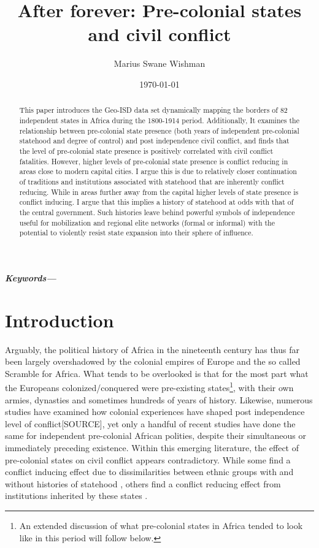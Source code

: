 \documentclass[12pt]{article}
\title{After forever: Pre-colonial states and civil conflict}
\author[1]{Marius Swane Wishman}
\affil[1]{Department of Sociology and Political Science, NTNU}
\date{\today}
\providecommand{\keywords}[1]
{
	\small	
	\textbf{\textit{Keywords---}} #1
}
\begin{document}
\maketitle

\begin{abstract}

This paper introduces the Geo-ISD data set dynamically mapping the borders of 82
independent states in Africa during the 1800-1914 period. Additionally, It
examines the relationship between pre-colonial state presence (both years of
independent pre-colonial statehood and degree of control) and post independence
civil conflict, and finds that the level of pre-colonial state presence is
positively correlated with civil conflict fatalities. However, higher levels of
pre-colonial state presence is conflict reducing in areas close to modern
capital cities. I argue this is due to relatively closer continuation of
traditions and institutions associated with statehood that are inherently
conflict reducing. While in areas further away from the capital higher levels of
state presence is conflict inducing. I argue that this implies a history of
statehood at odds with that of the central government. Such histories leave
behind powerful symbols of independence useful for mobilization and regional
elite networks (formal or informal) with the potential to violently resist state
expansion into their sphere of influence. 

\end{abstract}

\keywords{}


\onehalfspacing


\newpage

\section{Introduction}

Arguably, the political history of Africa in the nineteenth century has thus far
been largely overshadowed by the colonial empires of Europe and the so called
Scramble for Africa. What tends to be overlooked is that for the most part what
the Europeans colonized/conquered were pre-existing states\footnote{An extended
discussion of what pre-colonial states in Africa tended to look like in this
period will follow below.}, with their own armies, dynasties and sometimes
hundreds of years of history. Likewise, numerous studies have examined how
colonial experiences have shaped post independence level of conflict[SOURCE],
yet only a handful of recent studies have done the same for independent
pre-colonial African polities, despite their simultaneous or immediately
preceding existence. Within this emerging literature, the effect of pre-colonial
states on civil conflict appears contradictory. While some find a conflict
inducing effect due to dissimilarities between ethnic groups with and without
histories of statehood \citep{Englebert2002, Paine2019}, others find a conflict
reducing effect from institutions inherited by these states
\citep{Depetris-Chauvin2016, Wig2016}.
\end{document}
